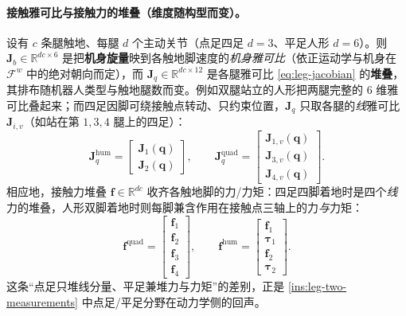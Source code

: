 \paragraph{接触雅可比与接触力的堆叠（维度随构型而变）。}
设有 $c$ 条腿触地、每腿 $d$ 个主动关节（点足四足 $d{=}3$、平足人形 $d{=}6$）。则 $\mathbf{J}_b\in\mathbb{R}^{dc\times6}$ 是把\textbf{机身旋量}映到各触地脚速度的\emph{机身雅可比}（依正运动学与机身在 $\mathcal{F}^w$ 中的绝对朝向而定），而 $\mathbf{J}_q\in\mathbb{R}^{dc\times12}$ 是各腿雅可比 \cref{eq:leg-jacobian} 的\textbf{堆叠}，其排布随机器人类型与触地腿数而变。例如双腿站立的人形把两腿完整的 $6$ 维雅可比叠起来；而四足因脚可绕接触点转动、只约束位置，$\mathbf{J}_q$ 只取各腿的\emph{线}雅可比 $\mathbf{J}_{i,v}$（如站在第 $1,3,4$ 腿上的四足）：
\begin{equation}
  \mathbf{J}_q^{\text{hum}}=\begin{bmatrix}\mathbf{J}_1(\mathbf{q})\\\mathbf{J}_2(\mathbf{q})\end{bmatrix},\qquad
  \mathbf{J}_q^{\text{quad}}=\begin{bmatrix}\mathbf{J}_{1,v}(\mathbf{q})\\\mathbf{J}_{3,v}(\mathbf{q})\\\mathbf{J}_{4,v}(\mathbf{q})\end{bmatrix}.
  \label{eq:leg-Jq-stack}
\end{equation}
相应地，接触力堆叠 $\mathbf{f}\in\mathbb{R}^{dc}$ 收齐各触地脚的力/力矩：四足四脚着地时是四个\emph{线}力的堆叠，人形双脚着地时则每脚兼含作用在接触点三轴上的力\emph{与}力矩：
\begin{equation}
  \mathbf{f}^{\text{quad}}=\begin{bmatrix}\mathbf{f}_1\\\mathbf{f}_2\\\mathbf{f}_3\\\mathbf{f}_4\end{bmatrix},\qquad
  \mathbf{f}^{\text{hum}}=\begin{bmatrix}\mathbf{f}_1\\\boldsymbol{\tau}_1\\\mathbf{f}_2\\\boldsymbol{\tau}_2\end{bmatrix}.
  \label{eq:leg-f-stack}
\end{equation}
这条“点足只堆线分量、平足兼堆力与力矩”的差别，正是 \cref{ins:leg-two-measurements} 中点足/平足分野在动力学侧的回声。

